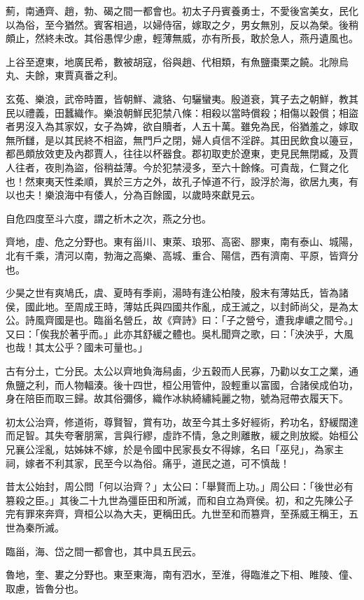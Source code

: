 \begin{pinyinscope}
薊，南通齊、趙，勃、碣之間一都會也。初太子丹賓養勇士，不愛後宮美女，民化以為俗，至今猶然。賓客相過，以婦侍宿，嫁取之夕，男女無別，反以為榮。後稍頗止，然終未改。其俗愚悍少慮，輕薄無威，亦有所長，敢於急人，燕丹遺風也。

上谷至遼東，地廣民希，數被胡寇，俗與趙、代相類，有魚鹽棗栗之饒。北隙烏丸、夫餘，東賈真番之利。

玄菟、樂浪，武帝時置，皆朝鮮、濊貉、句驪蠻夷。殷道衰，箕子去之朝鮮，教其民以禮義，田蠶織作。樂浪朝鮮民犯禁八條：相殺以當時償殺；相傷以穀償；相盜者男沒入為其家奴，女子為婢，欲自贖者，人五十萬。雖免為民，俗猶羞之，嫁取無所讎，是以其民終不相盜，無門戶之閉，婦人貞信不淫辟。其田民飲食以籩豆，都邑頗放效吏及內郡賈人，往往以杯器食。郡初取吏於遼東，吏見民無閉臧，及賈人往者，夜則為盜，俗稍益薄。今於犯禁浸多，至六十餘條。可貴哉，仁賢之化也！然東夷天性柔順，異於三方之外，故孔子悼道不行，設浮於海，欲居九夷，有以也夫！樂浪海中有倭人，分為百餘國，以歲時來獻見云。

自危四度至斗六度，謂之析木之次，燕之分也。

齊地，虛、危之分野也。東有甾川、東萊、琅邪、高密、膠東，南有泰山、城陽，北有千乘，清河以南，勃海之高樂、高城、重合、陽信，西有濟南、平原，皆齊分也。

少昊之世有爽鳩氏，虞、夏時有季崱，湯時有逢公柏陵，殷末有薄姑氏，皆為諸侯，國此地。至周成王時，薄姑氏與四國共作亂，成王滅之，以封師尚父，是為太公。詩風齊國是也。臨甾名營丘，故《齊詩》曰：「子之營兮，遭我虖嶩之間兮。」又曰：「俟我於著乎而。」此亦其舒緩之體也。吳札聞齊之歌，曰：「泱泱乎，大風也哉！其太公乎？國未可量也。」

古有分土，亡分民。太公以齊地負海舄鹵，少五穀而人民寡，乃勸以女工之業，通魚鹽之利，而人物輻湊。後十四世，桓公用管仲，設輕重以富國，合諸侯成伯功，身在陪臣而取三歸。故其俗彌侈，織作冰紈綺繡純麗之物，號為冠帶衣履天下。

初太公治齊，修道術，尊賢智，賞有功，故至今其土多好經術，矜功名，舒緩闊達而足智。其失夸奢朋黨，言與行繆，虛詐不情，急之則離散，緩之則放縱。始桓公兄襄公淫亂，姑姊妹不嫁，於是令國中民家長女不得嫁，名曰「巫兒」，為家主祠，嫁者不利其家，民至今以為俗。痛乎，道民之道，可不慎哉！

昔太公始封，周公問「何以治齊？」太公曰：「舉賢而上功。」周公曰：「後世必有篡殺之臣。」其後二十九世為彊臣田和所滅，而和自立為齊侯。初，和之先陳公子完有罪來奔齊，齊桓公以為大夫，更稱田氏。九世至和而篡齊，至孫威王稱王，五世為秦所滅。

臨甾，海、岱之間一都會也，其中具五民云。

魯地，奎、婁之分野也。東至東海，南有泗水，至淮，得臨淮之下相、睢陵、僮、取慮，皆魯分也。


\end{pinyinscope}
